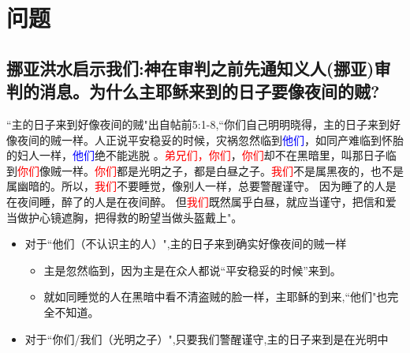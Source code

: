 
\section{问题}
\subsection{挪亚洪水启示我们:神在审判之前先通知义人(挪亚)审判的消息。为什么主耶稣来到的日子要像夜间的贼?}
“主的日子来到好像夜间的贼"出自帖前5:1-8,“你们自己明明晓得，主的日子来到好像夜间的贼一样。人正说平安稳妥的时候，灾祸忽然临到\textcolor{blue}{他们}，如同产难临到怀胎的妇人一样，\textcolor{blue}{他们}绝不能逃脱
。\textcolor{red}{弟兄们，你们}，\textcolor{red}{你们}却不在黑暗里，叫那日子临到\textcolor{red}{你们}像贼一样。\textcolor{red}{你们}都是光明之子，都是白昼之子。\textcolor{red}{我们}不是属黑夜的，也不是属幽暗的。所以，\textcolor{red}{我们}不要睡觉，像别人一样，总要警醒谨守。 因为睡了的人是在夜间睡，醉了的人是在夜间醉。 但\textcolor{red}{我们}既然属乎白昼，就应当谨守，把信和爱当做护心镜遮胸，把得救的盼望当做头盔戴上"。
\begin{itemize}[noitemsep]
\item 对于“他们（不认识主的人）",主的日子来到确实好像夜间的贼一样
\begin{itemize}[noitemsep]
\item 主是忽然临到，因为主是在众人都说“平安稳妥的时候”来到。
\item 就如同睡觉的人在黑暗中看不清盗贼的脸一样，主耶稣的到来,“他们"也完全不知道。
\end{itemize}
\item 对于“你们/我们（光明之子）",只要我们警醒谨守,主的日子来到是在光明中
\end{itemize}

